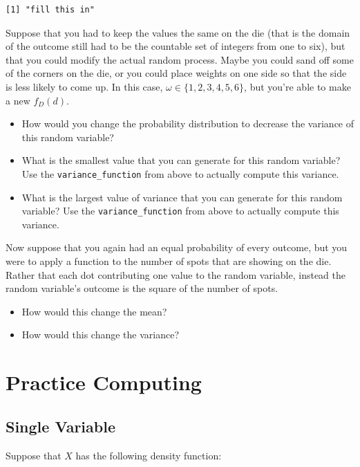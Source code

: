 \documentclass[
  letterpaper,
  DIV=11,
  numbers=noendperiod]{scrreprt}
\providecommand{\tightlist}{%
  \setlength{\itemsep}{0pt}\setlength{\parskip}{0pt}}\usepackage{longtable,booktabs,array}
\begin{document}
\begin{verbatim}
[1] "fill this in"
\end{verbatim}

Suppose that you had to keep the values the same on the die (that is the
domain of the outcome still had to be the countable set of integers from
one to six), but that you could modify the actual random process. Maybe
you could sand off some of the corners on the die, or you could place
weights on one side so that the side is less likely to come up. In this
case, \(\omega \in \{1,2,3,4,5,6\}\), but you're able to make a new
\(f_{D}(d)\).

\begin{itemize}
\tightlist
\item
  How would you change the probability distribution to decrease the
  variance of this random variable?
\item
  What is the smallest value that you can generate for this random
  variable? Use the \texttt{variance\_function} from above to actually
  compute this variance.
\item
  What is the largest value of variance that you can generate for this
  random variable? Use the \texttt{variance\_function} from above to
  actually compute this variance.
\end{itemize}

Now suppose that you again had an equal probability of every outcome,
but you were to apply a function to the number of spots that are showing
on the die. Rather that each dot contributing one value to the random
variable, instead the random variable's outcome is the square of the
number of spots.

\begin{itemize}
\tightlist
\item
  How would this change the mean?
\item
  How would this change the variance?
\end{itemize}

\section{Practice Computing}\label{practice-computing}

\subsection{Single Variable}\label{single-variable}

Suppose that \(X\) has the following density function:
\end{document}
